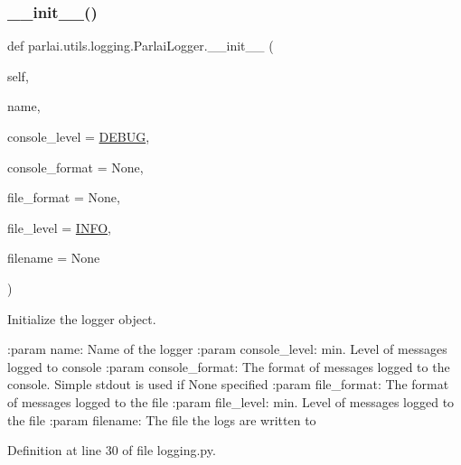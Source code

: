 \subsubsection{\texorpdfstring{\+\_\+\+\_\+init\+\_\+\+\_\+()}{\_\_init\_\_()}}
{\footnotesize\ttfamily def parlai.\+utils.\+logging.\+Parlai\+Logger.\+\_\+\+\_\+init\+\_\+\+\_\+ (\begin{DoxyParamCaption}\item[{}]{self,  }\item[{}]{name,  }\item[{}]{console\+\_\+level = {\ttfamily \hyperlink{namespaceparlai_1_1utils_1_1logging_ab324194e88a7aab20579ec176d8e47ed}{D\+E\+B\+UG}},  }\item[{}]{console\+\_\+format = {\ttfamily None},  }\item[{}]{file\+\_\+format = {\ttfamily None},  }\item[{}]{file\+\_\+level = {\ttfamily \hyperlink{namespaceparlai_1_1utils_1_1logging_a4bc2de74317465e5d1a8b5d7b913d48a}{I\+N\+FO}},  }\item[{}]{filename = {\ttfamily None} }\end{DoxyParamCaption})}

\begin{DoxyVerb}Initialize the logger object.

:param name:
    Name of the logger
:param console_level:
    min. Level of messages logged to console
:param console_format:
    The format of messages logged to the console.
    Simple stdout is used if None specified
:param file_format:
    The format of messages logged to the file
:param file_level:
    min. Level of messages logged to the file
:param filename:
    The file the logs are written to
\end{DoxyVerb}
 

Definition at line 30 of file logging.\+py.


